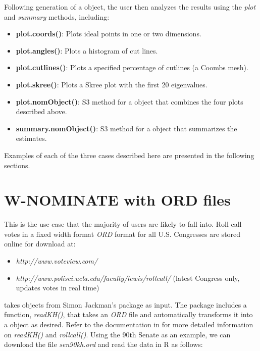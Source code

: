 \documentclass[12pt]{article}
\begin{document}
Following generation of a \verb@wnominate@ object, the user then
analyzes the results using the \emph{plot} and \emph{summary} methods,
including:

\begin{itemize}
\item \textbf{plot.coords()}: Plots ideal points in one or two dimensions.
\item \textbf{plot.angles()}: Plots a histogram of cut lines.
\item \textbf{plot.cutlines()}: Plots a specified percentage of cutlines (a Coombs mesh).
\item \textbf{plot.skree()}: Plots a Skree plot with the first 20 eigenvalues.
\item \textbf{plot.nomObject()}: S3 method for a \verb@wnominate@ object
that combines the four plots described above.
\item \textbf{summary.nomObject()}: S3 method for a \verb@wnominate@ object
that summarizes the estimates.
\end{itemize}

Examples of each of the three cases described here are presented
in the following sections.

\section{W-NOMINATE with ORD files}

This is the use case that the majority of \verb@wnominate@ users
are likely to fall into.  Roll call votes in a fixed width format
\emph{ORD} format for all U.S. Congresses are stored online for
download at:

\begin{itemize}
\item \emph{http://www.voteview.com/} \item
\emph{http://www.polisci.ucla.edu/faculty/lewis/rollcall/} (latest Congress
only, updates votes in real time)
\end{itemize}

\verb@wnominate@ takes \verb@rollcall@ objects from Simon Jackman's
\verb@pscl@ package as input. The package includes a function,
\emph{readKH()}, that takes an \emph{ORD} file and automatically
transforms it into a \verb@rollcall@ object as desired. Refer to
the documentation in \verb@pscl@ for more detailed information on
\emph{readKH()} and \emph{rollcall()}.  Using the 90th Senate as
an example, we can download the file \emph{sen90kh.ord} and read
the data in R as follows:\\
\end{document}

